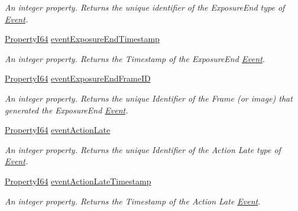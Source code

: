 \begin{DoxyCompactItemize}
\begin{DoxyCompactList}\small\item\em An integer property. Returns the unique identifier of the Exposure\+End type of \hyperlink{classmv_i_m_p_a_c_t_1_1acquire_1_1_event}{Event}. \end{DoxyCompactList}\item 
\hyperlink{group___common_interface_ga81749b2696755513663492664a18a893}{Property\+I64} \hyperlink{classmv_i_m_p_a_c_t_1_1acquire_1_1_gen_i_cam_1_1_event_control_a90f0f5d64ac0c6ef70a4e2a8e1e7681b}{event\+Exposure\+End\+Timestamp}
\begin{DoxyCompactList}\small\item\em An integer property. Returns the Timestamp of the Exposure\+End \hyperlink{classmv_i_m_p_a_c_t_1_1acquire_1_1_event}{Event}. \end{DoxyCompactList}\item 
\hyperlink{group___common_interface_ga81749b2696755513663492664a18a893}{Property\+I64} \hyperlink{classmv_i_m_p_a_c_t_1_1acquire_1_1_gen_i_cam_1_1_event_control_aa2b82bf02578df929011c23843238dcc}{event\+Exposure\+End\+Frame\+I\+D}
\begin{DoxyCompactList}\small\item\em An integer property. Returns the unique Identifier of the Frame (or image) that generated the Exposure\+End \hyperlink{classmv_i_m_p_a_c_t_1_1acquire_1_1_event}{Event}. \end{DoxyCompactList}\item 
\hyperlink{group___common_interface_ga81749b2696755513663492664a18a893}{Property\+I64} \hyperlink{classmv_i_m_p_a_c_t_1_1acquire_1_1_gen_i_cam_1_1_event_control_a26a3e024f3e6fe2ed85460b541705bc9}{event\+Action\+Late}
\begin{DoxyCompactList}\small\item\em An integer property. Returns the unique Identifier of the Action Late type of \hyperlink{classmv_i_m_p_a_c_t_1_1acquire_1_1_event}{Event}. \end{DoxyCompactList}\item 
\hyperlink{group___common_interface_ga81749b2696755513663492664a18a893}{Property\+I64} \hyperlink{classmv_i_m_p_a_c_t_1_1acquire_1_1_gen_i_cam_1_1_event_control_a7a4db5a663faf71da66e079f684392aa}{event\+Action\+Late\+Timestamp}
\begin{DoxyCompactList}\small\item\em An integer property. Returns the Timestamp of the Action Late \hyperlink{classmv_i_m_p_a_c_t_1_1acquire_1_1_event}{Event}. \end{DoxyCompactList}\item 

\end{DoxyCompactItemize}
